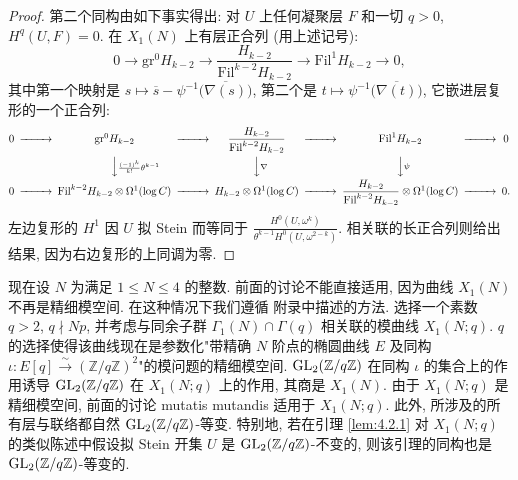 \begin{proof}
第二个同构由如下事实得出: 对 $U$ 上任何凝聚层 $F$ 和一切 $q > 0$, $H^{q}(U,F) = 0$.
在 $X_1(N)$ 上有层正合列 (用上述记号):
\[
0 \to \mathrm{gr}^{0}H_{k-2} \to \frac{H_{k-2}}{\mathrm{Fil}^{k-2}H_{k-2}} \to \mathrm{Fil}^{1}H_{k-2} \to 0,
\]
其中第一个映射是 $s \mapsto \overline{s} - \psi^{-1}\bigl(\overline{\nabla(s)}\bigr)$, 第二个是 $t \mapsto \psi^{-1}\bigl(\overline{\nabla(t)}\bigr)$,
它嵌进层复形的一个正合列:
\[
\begin{CD}
0 @>>> \mathrm{gr}^{0}H_{k-2} @>>> \dfrac{H_{k-2}}{\mathrm{Fil}^{k-2}H_{k-2}} @>>> \mathrm{Fil}^{1}H_{k-2} @>>> 0\\
@. @VV{\frac{(-1)^{k}}{k!}\theta^{k-1}}V @VV{\nabla}V @VV{\psi}V\\
0 @>>> \mathrm{Fil}^{k-2}H_{k-2} \otimes \Omega^{1}(\log C) @>>> H_{k-2} \otimes \Omega^{1}(\log C) @>>> \dfrac{H_{k-2}}{\mathrm{Fil}^{k-2}H_{k-2}} \otimes \Omega^{1}(\log C) @>>> 0.
\end{CD}
\]
左边复形的 $H^{1}$ 因 $U$ 拟 Stein 而等同于 $\frac{H^{0}(U,\omega^{k})}{\theta^{k-1}H^{0}(U,\omega^{2-k})}$.
相关联的长正合列则给出结果, 因为右边复形的上同调为零.
\end{proof}

现在设 $N$ 为满足 $1 \le N \le 4$ 的整数.
前面的讨论不能直接适用, 因为曲线 $X_1(N)$ 不再是精细模空间.
在这种情况下我们遵循 \cite{ref:10} 附录中描述的方法.
选择一个素数 $q > 2$, $q \nmid Np$, 并考虑与同余子群 $\Gamma_1(N) \cap \Gamma(q)$ 相关联的模曲线 $X_1(N;q)$.
$q$ 的选择使得该曲线现在是参数化"带精确 $N$ 阶点的椭圆曲线 $E$ 及同构 $\iota : E[q] \xrightarrow{\sim} (\mathbb{Z}/q\mathbb{Z})^{2}$"的模问题的精细模空间.
$\mathrm{GL}_2(\mathbb{Z}/q\mathbb{Z})$ 在同构 $\iota$ 的集合上的作用诱导 $\mathrm{GL}_2(\mathbb{Z}/q\mathbb{Z})$ 在 $X_1(N;q)$ 上的作用, 其商是 $X_1(N)$.
由于 $X_1(N;q)$ 是精细模空间, 前面的讨论 mutatis mutandis 适用于 $X_1(N;q)$.
此外, 所涉及的所有层与联络都自然 $\mathrm{GL}_2(\mathbb{Z}/q\mathbb{Z})$-等变.
特别地, 若在引理 \ref{lem:4.2.1} 对 $X_1(N;q)$ 的类似陈述中假设拟 Stein 开集 $U$ 是 $\mathrm{GL}_2(\mathbb{Z}/q\mathbb{Z})$-不变的, 则该引理的同构也是 $\mathrm{GL}_2(\mathbb{Z}/q\mathbb{Z})$-等变的.
